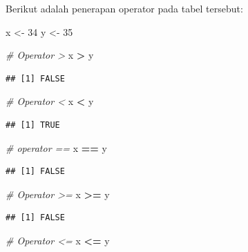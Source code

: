 \documentclass[]{book}
\newenvironment{Shaded}{\begin{snugshade}}{\end{snugshade}}
\newcommand{\DecValTok}[1]{\textcolor[rgb]{0.00,0.00,0.81}{#1}}
\newcommand{\StringTok}[1]{\textcolor[rgb]{0.31,0.60,0.02}{#1}}
\newcommand{\CommentTok}[1]{\textcolor[rgb]{0.56,0.35,0.01}{\textit{#1}}}
\newcommand{\OperatorTok}[1]{\textcolor[rgb]{0.81,0.36,0.00}{\textbf{#1}}}
\newcommand{\NormalTok}[1]{#1}
\begin{document}
Berikut adalah penerapan operator pada tabel tersebut:

\begin{Shaded}
\begin{Highlighting}[]
\NormalTok{x <-}\StringTok{ }\DecValTok{34}
\NormalTok{y <-}\StringTok{ }\DecValTok{35}

\CommentTok{# Operator >}
\NormalTok{x }\OperatorTok{>}\StringTok{ }\NormalTok{y}
\end{Highlighting}
\end{Shaded}

\begin{verbatim}
## [1] FALSE
\end{verbatim}

\begin{Shaded}
\begin{Highlighting}[]
\CommentTok{# Operator <}
\NormalTok{x }\OperatorTok{<}\StringTok{ }\NormalTok{y}
\end{Highlighting}
\end{Shaded}

\begin{verbatim}
## [1] TRUE
\end{verbatim}

\begin{Shaded}
\begin{Highlighting}[]
\CommentTok{# operator ==}
\NormalTok{x }\OperatorTok{==}\StringTok{ }\NormalTok{y}
\end{Highlighting}
\end{Shaded}

\begin{verbatim}
## [1] FALSE
\end{verbatim}

\begin{Shaded}
\begin{Highlighting}[]
\CommentTok{# Operator >=}
\NormalTok{x }\OperatorTok{>=}\StringTok{ }\NormalTok{y}
\end{Highlighting}
\end{Shaded}

\begin{verbatim}
## [1] FALSE
\end{verbatim}

\begin{Shaded}
\begin{Highlighting}[]
\CommentTok{# Operator <=}
\NormalTok{x }\OperatorTok{<=}\StringTok{ }\NormalTok{y}
\end{Highlighting}
\end{Shaded}
\end{document}
